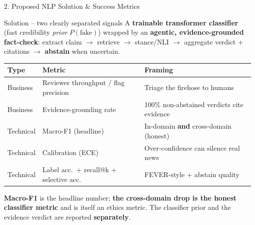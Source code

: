 \documentclass[10pt,aspectratio=169]{beamer}
\begin{document}
\begin{frame}{2. Proposed NLP Solution \& Success Metrics}
\begin{block}{Solution -- two clearly separated signals}
A \textbf{trainable transformer classifier} (fast credibility \emph{prior} $P(\text{fake})$) wrapped by an \textbf{agentic, evidence-grounded fact-check}: extract claim $\rightarrow$ retrieve $\rightarrow$ stance/NLI $\rightarrow$ aggregate verdict + citations $\rightarrow$ \textbf{abstain} when uncertain.
\end{block}

\begin{table}[h]
\centering\small
\begin{tabular}{lll}
\toprule
\textbf{Type} & \textbf{Metric} & \textbf{Framing} \\
\midrule
Business & Reviewer throughput / flag precision & Triage the firehose to humans \\
Business & Evidence-grounding rate & 100\% non-abstained verdicts cite evidence \\
Technical & Macro-F1 (headline) & In-domain \textbf{and} cross-domain (honest) \\
Technical & Calibration (ECE) & Over-confidence can silence real news \\
Technical & Label acc.\ + recall@k + selective acc. & FEVER-style + abstain quality \\
\bottomrule
\end{tabular}
\end{table}

\small \textbf{Macro-F1} is the headline number; \textbf{the cross-domain drop is the honest classifier metric} and is itself an ethics metric. The classifier prior and the evidence verdict are reported \textbf{separately}.
\end{frame}
\end{document}
